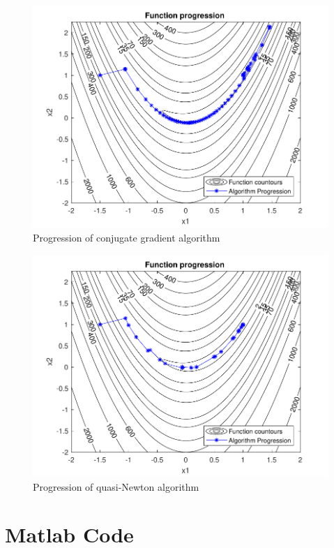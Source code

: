 \documentclass{article}
\newcommand{\wide}{0.9\linewidth}
\begin{document}
\begin{figure}[h]
	\centering
	\includegraphics[width=\wide]{progression2.pdf}
	\caption{Progression of conjugate gradient algorithm}
	\label{fig:steepest}
\end{figure}

\begin{figure}[h]
	\centering
	\includegraphics[width=\wide]{progression3.pdf}
	\caption{Progression of quasi-Newton algorithm}
	\label{fig:steepest}
\end{figure}



\section{Matlab Code}
\end{document}
